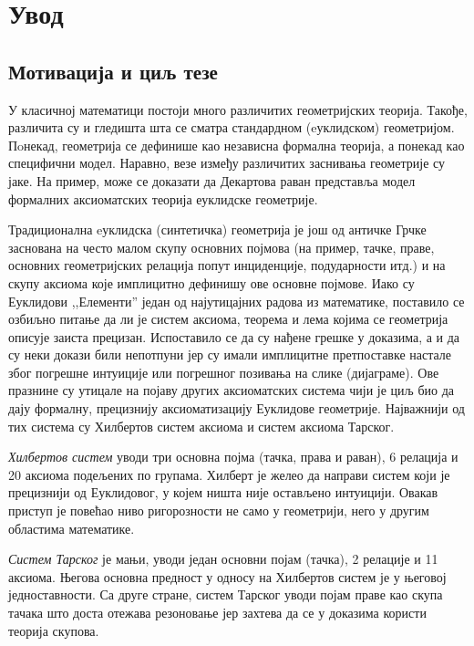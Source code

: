 \chapter{Увод}

\section{Мотивација и циљ тезе}

У класичној математици постоји много различитих геометријских
теорија. Такође, разли\-чи\-та су и гледишта шта се сматра стандардном
(eуклидском) геометријом. Пoнекад, геоме\-три\-ја се дефинише као
независна формална теорија, а понекад као специфични модел. Наравно,
везе између различитих заснивања геометрије су јаке. На пример, може
се доказати да Дека\-рто\-ва раван представља модел формалних
аксиоматских теорија еуклидске геометрије.

Традиционална eуклидска (синтетичка) геометрија је још од античке Грчке
заснована на често малом скупу основних појмова (на пример, тачке,
праве, основних геометријских релација попут инциденције, подударности
итд.) и на скупу аксиома које имплицитно дефинишу ове основне
појмове. Иако су Еуклидови ,,Елементи'' један од најутицајних радова
из математике, поставило се озбиљно питање да ли је систем аксиома,
теорема и лема којима се геометрија описује заиста
прецизан. Испоставило се да су нађене грешке у доказима, а и да су
неки докази били непотпуни јер су имали имплицитне претпоставке
настале због погрешне интуиције или погрешног позивања на слике
(дијаграме). Ове празнине су утицале на појаву других аксиоматских
система чији је циљ био да дају формалну, прецизнију аксиоматизацију
Еуклидове геометрије. Најважнији од тих система су Хилбертов систем
аксиома и систем аксиома Тарског.

\emph{Хилбертов систем} уводи три основна појма (тачка, права и
раван), 6 релација и 20 аксиома подељених по групама. Хилберт је желео
да направи систем који је прецизнији од Еуклидовог, у којем ништа није
остављено интуицији. Овакав приступ је повећао ниво ригорозности не
само у геометрији, него у другим областима математике.

\emph{Систем Тарског} је мањи, уводи један основни појам (тачка), 2
релације и 11 аксиома. Његова основна предност у односу на Хилбертов
систем је у његовој једноставности. Са друге стране, систем Тарског
уводи појам праве као скупа тачака што доста отежава резоновање јер
захтева да се у доказима користи теорија скупова.


